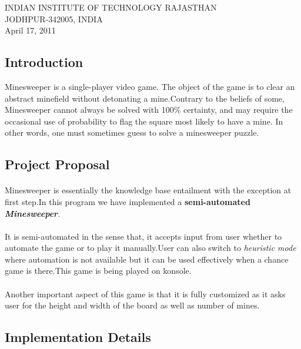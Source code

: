 \documentclass[12pt,a4paper]{report}
\begin{document}
\begin{center}
{\Large      INDIAN INSTITUTE OF TECHNOLOGY  RAJASTHAN}\\
{\large      JODHPUR-342005, INDIA}\\

{\large                           April 17, 2011}
\end{center}
\clearpage
\subsection*{Introduction}
Minesweeper is a single-player video game. The object of the game is to clear an abstract minefield without detonating a mine.Contrary to the beliefs of some, Minesweeper cannot always be solved with 100$\%$ certainty, and may require the occasional use of probability to flag the square most likely to have a mine. In other words, one must sometimes guess to solve a minesweeper puzzle.
\subsection*{Project Proposal}
\paragraph*{}
Minesweeper is essentially the knowledge base entailment with the exception at first step.In this program we have implemented a \textbf{semi-automated \textit{Minesweeper}}.
\paragraph*{}
It is semi-automated in the sense that, it accepts input from user whether to automate the game or to play it manually.User can also switch to \textit{heuristic mode} where automation is not available but it can be used effectively when a chance game is there.This game is being played on konsole.
\paragraph*{}
Another important aspect of this game is that it is fully customized as it asks user for the height and width of the board as well as number of mines.
\clearpage
\subsection*{Implementation Details}
\end{document}
